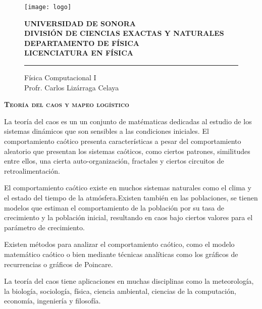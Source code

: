 
\date{19 de mayo del 2017}


\begin{titlepage}

    \begin{figure}[ht!]
    \centering
    \texttt{[image: logo]}
    
    \textbf{UNIVERSIDAD DE SONORA \\ DIVISIÓN DE CIENCIAS EXACTAS Y NATURALES \\ DEPARTAMENTO DE FÍSICA \\ LICENCIATURA EN FÍSICA}
	\maketitle
    \hrule \bigskip
    \large{Física Computacional I}\\
	Profr. Carlos Lizárraga Celaya
    \end{figure}
\thispagestyle{empty}

\end{titlepage}

\newpage

\begin{center}
\huge{\textbf{\textsc{Teoría del caos y mapeo logístico}}}
\end{center}
\nocite{boeing}
\noindent La teoría del caos es un un conjunto de matématicas dedicadas al estudio de los sistemas dinámicos que son sensibles a las condiciones iniciales. El comportamiento caótico presenta características a pesar del comportamiento aleatorio que presentan los sistemas caóticos, como ciertos patrones, similitudes entre ellos, una cierta auto-organización, fractales y ciertos circuitos de retroalimentación.

El comportamiento caótico existe en muchos sistemas naturales como el clima y el estado del tiempo de la atmósfera.Existen también en las poblaciones, se tienen modelos que estiman el comportamiento de la población por su tasa de crecimiento y la población inicial, resultando en caos bajo ciertos valores para el parámetro de crecimiento. 

Existen métodos para analizar el comportamiento caótico, como el modelo matemático caótico o bien mediante técnicas analíticas como los gráficos de recurrencias o gráficos de Poincare.

La teoría del caos tiene aplicaciones en muchas disciplinas como la meteorología, la biología, sociología, física, ciencia ambiental, ciencias de la computación, economía, ingeniería y filosofía.\cite{caos}

